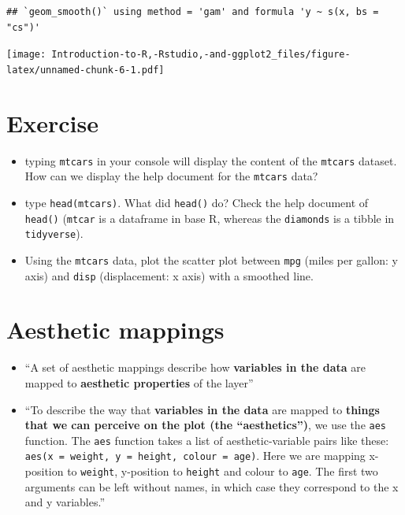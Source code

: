 \documentclass[]{book}
\begin{document}
\begin{verbatim}
## `geom_smooth()` using method = 'gam' and formula 'y ~ s(x, bs = "cs")'
\end{verbatim}

\texttt{[image: Introduction-to-R,-Rstudio,-and-ggplot2\_files/figure-latex/unnamed-chunk-6-1.pdf]}

\section{Exercise}\label{exercise}

\begin{itemize}
\item
  typing \texttt{mtcars} in your console will display the content of the
  \texttt{mtcars} dataset. How can we display the help document for the
  \texttt{mtcars} data?
\item
  type \texttt{head(mtcars)}. What did \texttt{head()} do? Check the
  help document of \texttt{head()} (\texttt{mtcar} is a dataframe in
  base R, whereas the \texttt{diamonds} is a tibble in
  \texttt{tidyverse}).
\item
  Using the \texttt{mtcars} data, plot the scatter plot between
  \texttt{mpg} (miles per gallon: y axis) and \texttt{disp}
  (displacement: x axis) with a smoothed line.
\end{itemize}

\section{Aesthetic mappings}\label{aesthetic-mappings}

\begin{itemize}
\item
  ``A set of aesthetic mappings describe how \textbf{variables in the
  data} are mapped to \textbf{aesthetic properties} of the layer''
  \citep{ggplot2}
\item
  ``To describe the way that \textbf{variables in the data} are mapped
  to \textbf{things that we can perceive on the plot (the
  ``aesthetics'')}, we use the \texttt{aes} function. The \texttt{aes}
  function takes a list of aesthetic-variable pairs like these:
  \texttt{aes(x\ =\ weight,\ y\ =\ height,\ colour\ =\ age)}. Here we
  are mapping x-position to \texttt{weight}, y-position to
  \texttt{height} and colour to \texttt{age}. The first two arguments
  can be left without names, in which case they correspond to the x and
  y variables.'' \citep{ggplot2}
\end{itemize}
\end{document}
